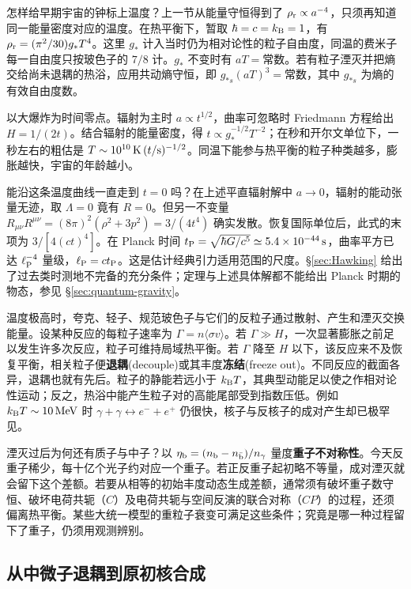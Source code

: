 怎样给早期宇宙的钟标上温度？上一节从能量守恒得到了 $\rho_{\rm r}\propto a^{-4}$，只须再知道同一能量密度对应的温度。在热平衡下，暂取 $\hbar=c=k_{\rm B}=1$，有 $\rho_{\rm r}=(\pi^2/30)g_*T^4$。这里 $g_*$ 计入当时仍为相对论性的粒子自由度，同温的费米子每一自由度只按玻色子的 $7/8$ 计。$g_*$ 不变时有 $aT=\text{常数}$。若有粒子湮灭并把熵交给尚未退耦的热浴，应用共动熵守恒，即 $g_{*s}(aT)^3=\text{常数}$，其中 $g_{*s}$ 为熵的有效自由度数。

以大爆炸为时间零点。辐射为主时 $a\propto t^{1/2}$，曲率可忽略时 Friedmann 方程给出 $H=1/(2t)$。结合辐射的能量密度，得 $t\propto g_*^{-1/2}T^{-2}$；在秒和开尔文单位下，一秒左右的粗估是 $T\sim10^{10}\,{\rm K}\,(t/{\rm s})^{-1/2}$。同温下能参与热平衡的粒子种类越多，膨胀越快，宇宙的年龄越小。

能沿这条温度曲线一直走到 $t=0$ 吗？在上述平直辐射解中 $a\to0$，辐射的能动张量无迹，取 $\Lambda=0$ 竟有 $R=0$。但另一不变量 $R_{\mu\nu}R^{\mu\nu}=(8\pi)^2(\rho^2+3p^2)=3/(4t^4)$ 确实发散。恢复国际单位后，此式的末项为 $3/[4(ct)^4]$。在 Planck 时间 $t_{\rm P}=\sqrt{\hbar G/c^5}\simeq5.4\times10^{-44}\,{\rm s}$，曲率平方已达 $\ell_{\rm P}^{-4}$ 量级，$\ell_{\rm P}=ct_{\rm P}$。这是估计经典引力适用范围的尺度。\S\ref{sec:Hawking} 给出了过去类时测地不完备的充分条件；定理与上述具体解都不能给出 Planck 时期的物态，参见 \S\ref{sec:quantum-gravity}。

温度极高时，夸克、轻子、规范玻色子与它们的反粒子通过散射、产生和湮灭交换能量。设某种反应的每粒子速率为 $\Gamma=n\langle\sigma v\rangle$。若 $\Gamma\gg H$，一次显著膨胀之前足以发生许多次反应，粒子可维持局域热平衡。若 $\Gamma$ 降至 $H$ 以下，该反应来不及恢复平衡，相关粒子便\textbf{退耦}(decouple)或其丰度\textbf{冻结}(freeze out)。不同反应的截面各异，退耦也就有先后。粒子的静能若远小于 $k_{\rm B}T$，其典型动能足以使之作相对论性运动；反之，热浴中能产生粒子对的高能尾部受到指数压低。例如 $k_{\rm B}T\sim10\,{\rm MeV}$ 时 $\gamma+\gamma\leftrightarrow e^-+e^+$ 仍很快，核子与反核子的成对产生却已极罕见。

湮灭过后为何还有质子与中子？以 $\eta_{\rm b}=(n_{\rm b}-n_{\bar{\rm b}})/n_\gamma$ 量度\textbf{重子不对称性}。今天反重子稀少，每十亿个光子约对应一个重子。若正反重子起初略不等量，成对湮灭就会留下这个差额。若要从相等的初始丰度动态生成差额，通常须有破坏重子数守恒、破坏电荷共轭（$C$）及电荷共轭与空间反演的联合对称（$CP$）的过程，还须偏离热平衡。某些大统一模型的重粒子衰变可满足这些条件；究竟是哪一种过程留下了重子，仍须用观测辨别。

\subsection{从中微子退耦到原初核合成}\label{sec:cosmo-bbn}

